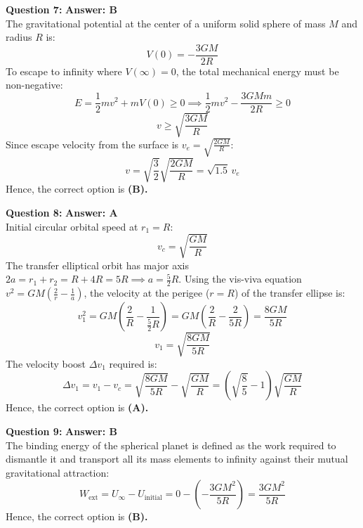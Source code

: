 \documentclass[11pt,a4paper]{article}
\begin{document}
\begin{tcolorbox}[solbox]
  \textbf{\textcolor{primaryDark}{Question 7:}} \hfill \textbf{\textcolor{l3Crimson}{Answer: B}}\\
  \vspace{3pt}
  The gravitational potential at the center of a uniform solid sphere of mass $M$ and radius $R$ is:
$$V(0) = -\frac{3GM}{2R}$$
\vspace{3pt}
To escape to infinity where $V(\infty) = 0$, the total mechanical energy must be non-negative:
$$E = \frac{1}{2}m v^2 + m V(0) \ge 0 \implies \frac{1}{2}m v^2 - \frac{3GMm}{2R} \ge 0$$
$$v \ge \sqrt{\frac{3GM}{R}}$$
\vspace{3pt}
Since escape velocity from the surface is $v_e = \sqrt{\frac{2GM}{R}}$:
$$v = \sqrt{\frac{3}{2}}\sqrt{\frac{2GM}{R}} = \sqrt{1.5}\,v_e$$
\vspace{3pt}
Hence, the correct option is \textbf{(B)}\textbf{.}
\end{tcolorbox}
\vspace{3pt}

\begin{tcolorbox}[solbox]
  \textbf{\textcolor{primaryDark}{Question 8:}} \hfill \textbf{\textcolor{l3Crimson}{Answer: A}}\\
  \vspace{3pt}
  Initial circular orbital speed at $r_1 = R$:
$$v_c = \sqrt{\frac{GM}{R}}$$
\vspace{3pt}
The transfer elliptical orbit has major axis $2a = r_1 + r_2 = R + 4R = 5R \implies a = \frac{5}{2}R$.
Using the vis-viva equation $v^2 = GM\left(\frac{2}{r} - \frac{1}{a}\right)$, the velocity at the perigee ($r = R$) of the transfer ellipse is:
$$v_1^2 = GM\left(\frac{2}{R} - \frac{1}{\frac{5}{2}R}\right) = GM\left(\frac{2}{R} - \frac{2}{5R}\right) = \frac{8GM}{5R}$$
$$v_1 = \sqrt{\frac{8GM}{5R}}$$
\vspace{3pt}
The velocity boost $\Delta v_1$ required is:
$$\Delta v_1 = v_1 - v_c = \sqrt{\frac{8GM}{5R}} - \sqrt{\frac{GM}{R}} = \left(\sqrt{\frac{8}{5}} - 1\right)\sqrt{\frac{GM}{R}}$$
\vspace{3pt}
Hence, the correct option is \textbf{(A)}\textbf{.}
\end{tcolorbox}
\vspace{3pt}

\begin{tcolorbox}[solbox]
  \textbf{\textcolor{primaryDark}{Question 9:}} \hfill \textbf{\textcolor{l3Crimson}{Answer: B}}\\
  \vspace{3pt}
  The binding energy of the spherical planet is defined as the work required to dismantle it and transport all its mass elements to infinity against their mutual gravitational attraction:
$$W_{\text{ext}} = U_{\infty} - U_{\text{initial}} = 0 - \left(-\frac{3GM^2}{5R}\right) = \frac{3GM^2}{5R}$$
\vspace{3pt}
Hence, the correct option is \textbf{(B)}\textbf{.}
\end{tcolorbox}
\vspace{3pt}
\end{document}
